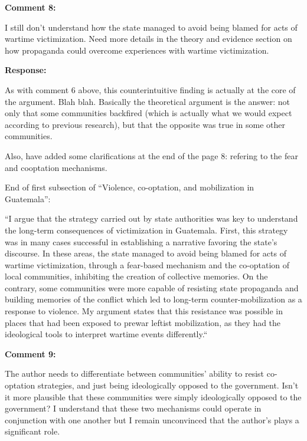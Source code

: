 \documentclass[12pt, a4paper, notitlepage]{article}
\begin{document}
\vspace{15pt}
\noindent\textbf{Comment 8:}
\begin{displayquote}
I still don't understand how the state managed to avoid being blamed for acts of wartime victimization. Need more details in the theory and evidence section on how propaganda could overcome experiences with wartime victimization.
\end{displayquote}

\noindent\textbf{Response:}

As with comment 6 above, this counterintuitive finding is actually at the core of the argument. Blah blah. Basically the theoretical argument is the answer: not only that some communities backfired (which is actually what we would expect according to previous research), but that the opposite was true in some other communities.

Also, have added some clarifications at the end of the page 8: refering to the fear and cooptation mechanisms.

End of first subsection of ``Violence, co-optation, and mobilization in Guatemala'':

``I argue that the strategy carried out by state authorities was key to understand the long-term consequences of victimization in Guatemala.
First, this strategy was in many cases successful in establishing a narrative favoring the state's discourse.
In these areas, the state managed to avoid being blamed for acts of wartime victimization, through a fear-based mechanism and the co-optation of local communities, inhibiting the creation of collective memories.
On the contrary, some communities were more capable of resisting state propaganda and building memories of the conflict which led to long-term counter-mobilization as a response to violence.
My argument states that this resistance was possible in places that had been exposed to prewar leftist mobilization, as they had the ideological tools to interpret wartime events differently.``

\vspace{15pt}
\noindent\textbf{Comment 9:}
\begin{displayquote}
The author needs to differentiate between communities' ability to resist co-optation strategies, and just being ideologically opposed to the government. Isn't it more plausible that these communities were simply ideologically opposed to the government? I understand that these two mechanisms could operate in conjunction with one another but I remain unconvinced that the author's plays a significant role.
\end{displayquote}
\end{document}
